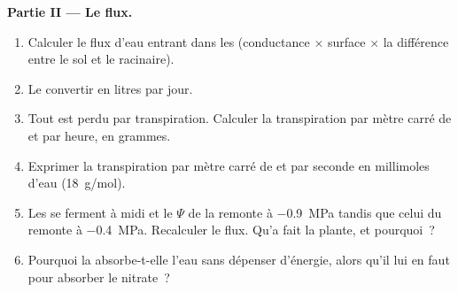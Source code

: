 \begin{problem}
\medskip
\noindent\textbf{Partie II --- Le flux.}
\begin{enumerate}[resume]
  \item Calculer le flux d'eau entrant dans les  (conductance
        $\times$ surface $\times$ la différence entre le sol et le
         racinaire).
  \item Le convertir en litres par jour.
  \item Tout est perdu par transpiration. Calculer la transpiration par
        mètre carré de  et par heure, en grammes.
  \item Exprimer la transpiration par mètre carré de  et par
        seconde en millimoles d'eau (\qty{18}{g/mol}).
  \item Les  se ferment à midi et le $\Psi$ de la 
        remonte à \qty{-0.9}{MPa} tandis que celui du  remonte à
        \qty{-0.4}{MPa}. Recalculer le flux. Qu'a fait la plante, et
        pourquoi~?
  \item Pourquoi la  absorbe-t-elle l'eau sans dépenser
        d'énergie, alors qu'il lui en faut pour absorber le nitrate~?
\end{enumerate}


\end{problem}
